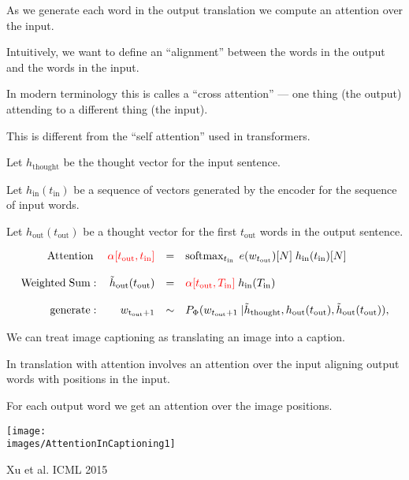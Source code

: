 {

As we generate each word in the output translation we compute an attention over the input.

\vfill
Intuitively, we want to define an ``alignment'' between the words in the output and the words in the input.

\vfill
In modern terminology this is calles a ``cross attention'' --- one thing (the output) attending to a different thing (the input).

\vfill
This is different from the ``self attention'' used in transformers.


Let $h_{\mathrm{thought}}$ be the thought vector for the input sentence.

\vfill
Let $h_{\mathrm{in}}(t_{\mathrm{in}})$ be a sequence of vectors generated by the encoder for the sequence of input words.

\vfill
Let $h_\mathrm{out}(t_\mathrm{out})$ be a thought vector for the first $t_\mathrm{out}$ words in the output sentence.

\vfill
{\huge
$$\begin{array}{rrcl}
  \mathrm{Attention}\; & {\color{red} \alpha[t_\mathrm{out},t_{\mathrm{in}}]} & =& \operatorname*{softmax}_{t_\mathrm{in}} \;e(w_{t_\mathrm{out}})[N]\;h_\mathrm{in}(t_\mathrm{in})[N] \\
   \\
   \mathrm{Weighted\; Sum:} & \tilde{h}_\mathrm{out}(t_\mathrm{out}) & = & {\color{red} \alpha[t_\mathrm{out},T_{\mathrm{in}}]}\;h_\mathrm{in}(T_{\mathrm{in}}) \\
  \\
  \mathrm{generate:} & w_\mathrm{t_\mathrm{out} + 1} & \sim & P_\Phi(w_{t_\mathrm{out}+1}\;|\tilde{h}_\mathrm{thought},
  h_\mathrm{out}(t_\mathrm{out}),
  \tilde{h}_\mathrm{out}(t_\mathrm{out})),
  \end{array}$$
}

We can treat image captioning as translating an image into a caption.

\vfill
In translation with attention involves an attention over the input aligning output words with positions in the input.

\vfill
For each output word we get an attention over the image positions.


\centerline{\texttt{[image: \\images/AttentionInCaptioning1]}}
\centerline{\Large Xu et al. ICML 2015}

}

